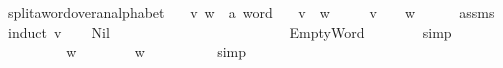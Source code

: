 \begin{isabellebody}
%
\endisatagproof
{\isafoldproof}%
%
\isadelimproof
\isanewline
%
\endisadelimproof
\isanewline
{}\isamarkupfalse%
\ split{\isacharunderscore}{\kern0pt}a{\isacharunderscore}{\kern0pt}word{\isacharunderscore}{\kern0pt}over{\isacharunderscore}{\kern0pt}an{\isacharunderscore}{\kern0pt}alphabet{\isacharcolon}{\kern0pt}\isanewline
\ \ \ v\ w\ {\isacharcolon}{\kern0pt}{\isacharcolon}{\kern0pt}\ {\isachardoublequoteopen}{\isacharprime}{\kern0pt}a\ word{\isachardoublequoteclose}\isanewline
\ \ \ {\isachardoublequoteopen}{\isacharparenleft}{\kern0pt}v\ {\isasymsqdot}\ w{\isacharparenright}{\kern0pt}\ {\isasymin}\ {\isasymSigma}\isactrlsup {\isacharasterisk}{\kern0pt}{\isachardoublequoteclose}\isanewline
\ \ \ {\isachardoublequoteopen}v\ {\isasymin}\ {\isasymSigma}\isactrlsup {\isacharasterisk}{\kern0pt}{\isachardoublequoteclose}\ \ {\isachardoublequoteopen}w\ {\isasymin}\ {\isasymSigma}\isactrlsup {\isacharasterisk}{\kern0pt}{\isachardoublequoteclose}\isanewline
%
\isadelimproof
\ \ %
\endisadelimproof
%
\isatagproof
{}\isamarkupfalse%
\ assms\isanewline
{}\isamarkupfalse%
\ {\isacharparenleft}{\kern0pt}induct\ v{\isacharparenright}{\kern0pt}\isanewline
\ \ \isamarkupfalse%
\ Nil\isanewline
\ \ \isakeywordONE{{\isacharbraceleft}{\kern0pt}}\isamarkupfalse%
\isanewline
\ \ \ \ \isamarkupfalse%
\ {}\isanewline
\ \ \ \ \isamarkupfalse%
\ {\isachardoublequoteopen}{\isasymepsilon}\ {\isasymin}\ {\isasymSigma}\isactrlsup {\isacharasterisk}{\kern0pt}{\isachardoublequoteclose}\isanewline
\ \ \ \ \ \ \isamarkupfalse%
\ EmptyWord\isanewline
\ \ \ \ \ \ \isamarkupfalse%
\ simp\isanewline
\ \ \isamarkupfalse%
\isanewline
\ \ \ \ \isamarkupfalse%
\ {}\isanewline
\ \ \ \ \isamarkupfalse%
\ {\isachardoublequoteopen}{\isasymepsilon}\ {\isasymsqdot}\ w\ {\isasymin}\ {\isasymSigma}\isactrlsup {\isacharasterisk}{\kern0pt}{\isachardoublequoteclose}\isanewline
\ \ \ \ \isamarkupfalse%
\ {\isachardoublequoteopen}w\ {\isasymin}\ {\isasymSigma}\isactrlsup {\isacharasterisk}{\kern0pt}{\isachardoublequoteclose}\isanewline
\ \ \ \ \ \ \isamarkupfalse%
\ simp\isanewline
\ \ \isakeywordONE{{\isacharbraceright}{\kern0pt}}\isamarkupfalse%
\isanewline
{}\isamarkupfalse%
\isanewline
\ \ \isamarkupfalse%

\end{isabellebody}
